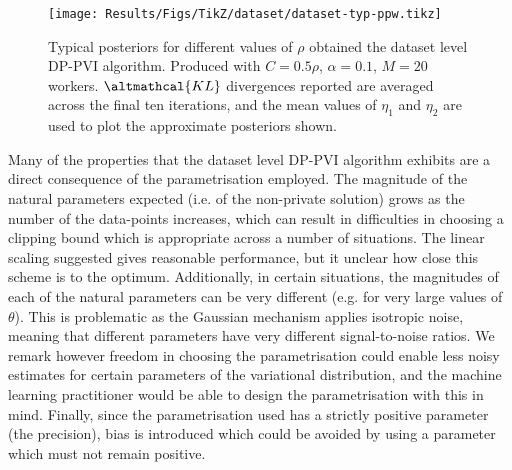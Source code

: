 \begin{figure}
	\texttt{[image: Results/Figs/TikZ/dataset/dataset-typ-ppw.tikz]}
	\centering
	\caption{\label{fig:results-dataset-post-rob} Typical posteriors for different values of $\rho$ obtained the dataset level DP-PVI algorithm. Produced with $C=0.5\rho$, $\alpha=0.1$, $M=20$ workers. $\altmathcal{KL}$ divergences reported are averaged across the final ten iterations, and the mean values of $\eta_1$ and $\eta_2$ are used to plot the approximate posteriors shown. }
\end{figure}

Many of the properties that the dataset level DP-PVI algorithm exhibits are a direct consequence of the parametrisation employed. The magnitude of the natural parameters expected (i.e. of the non-private solution) grows as the number of the data-points increases, which can result in difficulties in choosing a clipping bound which is appropriate across a number of situations. The linear scaling suggested gives reasonable performance, but it unclear how close this scheme is to the optimum. Additionally, in certain situations, the magnitudes of each of the natural parameters can be very different (e.g. for very large values of $\theta$). This is problematic as the Gaussian mechanism applies isotropic noise, meaning that different parameters have very different signal-to-noise ratios. We remark however freedom in choosing the parametrisation could enable less noisy estimates for certain parameters of the variational distribution, and the machine learning practitioner would be able to design the parametrisation with this in mind.  Finally, since the parametrisation used has a strictly positive parameter (the precision), bias is introduced which could be avoided by using a parameter which must not remain positive. 


